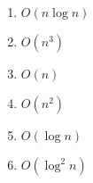 \documentclass[11pt]{article}
\begin{document}
\begin{enumerate}
    \item $O(n \log{n})$
    \item $O(n^3)$
    \item $O(n)$
    \item $O(n^2)$
    \item $O(\log{n})$
    \item $O(\log^2{n})$
\end{enumerate}
\end{document}
